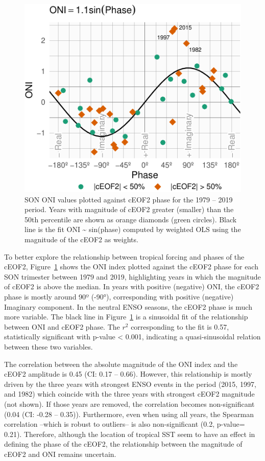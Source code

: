 \documentclass[smallextended]{svjour3}       %
\begin{document}
\begin{figure}
\centering
\includegraphics{../figures/enso-phase-1.pdf}
\caption{\label{fig:enso-phase}SON ONI values plotted against cEOF2 phase for the 1979 -- 2019 period. Years with magnitude of cEOF2 greater (smaller) than the 50th percentile are shown as orange diamonds (green circles). Black line is the fit ONI \textasciitilde{} sin(phase) computed by weighted OLS using the magnitude of the cEOF2 as weights.}
\end{figure}

To better explore the relationship between tropical forcing and phases of the cEOF2, Figure~\ref{fig:enso-phase} shows the ONI index plotted against the cEOF2 phase for each SON trimester between 1979 and 2019, highlighting years in which the magnitude of cEOF2 is above the median.
In years with positive (negative) ONI, the cEOF2 phase is mostly around 90º (-90°), corresponding with positive (negative) Imaginary component.
In the neutral ENSO seasons, the cEOF2 phase is much more variable.
The black line in Figure~\ref{fig:enso-phase} is a sinusoidal fit of the relationship between ONI and cEOF2 phase.
The \(r^2\) corresponding to the fit is 0.57, statistically significant with p-value \textless{} 0.001, indicating a quasi-sinusoidal relation between these two variables.

The correlation between the absolute magnitude of the ONI index and the cEOF2 amplitude is 0.45 (CI: 0.17 -- 0.66).
However, this relationship is mostly driven by the three years with strongest ENSO events in the period (2015, 1997, and 1982) which coincide with the three years with strongest cEOF2 magnitude (not shown).
If those years are removed, the correlation becomes non-significant (0.04 (CI: -0.28 -- 0.35)).
Furthermore, even when using all years, the Spearman correlation --which is robust to outliers-- is also non-significant (0.2, p-value= 0.21).
Therefore, although the location of tropical SST seem to have an effect in defining the phase of the cEOF2, the relationship between the magnitude of cEOF2 and ONI remains uncertain.
\end{document}
